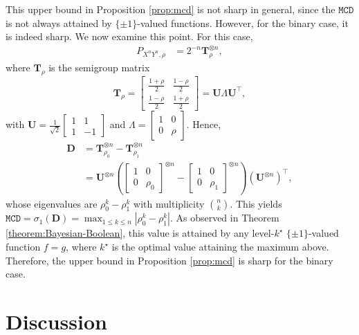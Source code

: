 \documentclass[journal,draftcls, onecolumn]{IEEEtran}
\begin{document}
This upper bound in  Proposition \ref{prop:mcd}  is not sharp in general, since the $\mathtt{MCD}$ is not always attained by $\{\pm1\}$-valued functions. However, for the binary case, it is indeed sharp. 
We now examine this point. 
For this case, 
\begin{align*}
P_{X^{n}Y^{n},\rho} & =2^{-n}\mathbf{T}^{\otimes n}_{\rho},
\end{align*}
where $\mathbf{T}_{\rho}$ is the semigroup matrix 
\[
\mathbf{T}_{\rho}=\begin{bmatrix}\frac{1+\rho}{2} & \frac{1-\rho}{2}\\
\frac{1-\rho}{2} & \frac{1+\rho}{2}
\end{bmatrix}=\mathbf{U}\Lambda\mathbf{U}^{\top},
\]
with $\mathbf{U}=\frac{1}{\sqrt{2}}\begin{bmatrix}1 & 1\\
1 & -1
\end{bmatrix}$ and $\Lambda=\begin{bmatrix}1 & 0\\
0 & \rho
\end{bmatrix}$. Hence, 
\begin{align*}
\mathbf{D} & =\mathbf{T}^{\otimes n}_{\rho_{0}}-\mathbf{T}^{\otimes n}_{\rho_{1}}\\
 & =\mathbf{U}^{\otimes n}(\begin{bmatrix}1 & 0\\
0 & \rho_{0}
\end{bmatrix}^{\otimes n}-\begin{bmatrix}1 & 0\\
0 & \rho_{1}
\end{bmatrix}^{\otimes n})(\mathbf{U}^{\otimes n})^{\top},
\end{align*}
whose eigenvalues  are $\rho^{k}_{0}-\rho^{k}_{1}$
with multiplicity ${n \choose k}$. This yields $\mathtt{MCD}=\sigma_{1}(\mathbf{D})=\max_{1\le k\le n}|\rho^{k}_{0}-\rho^{k}_{1}|$. 
As observed in Theorem \ref{theorem:Bayesian-Boolean}, this value is attained by any level-$k^\star$ $\{\pm1\}$-valued function $f=g$, where $k^\star$ is the optimal value attaining the maximum above. Therefore, the upper bound in Proposition \ref{prop:mcd} is sharp for the binary case. 

\section{Discussion} \label{section:discussion}
\end{document}
